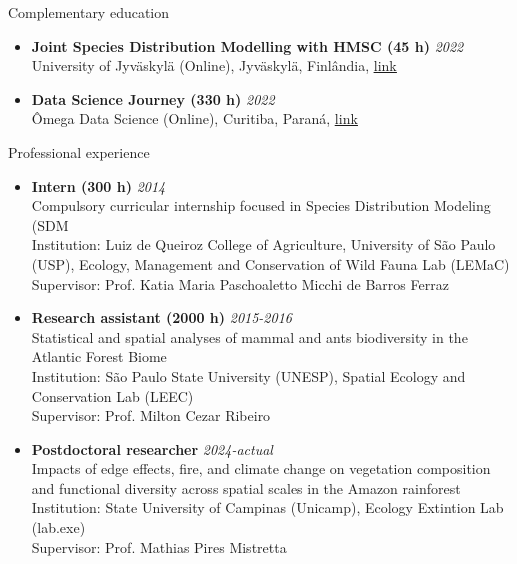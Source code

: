 \documentclass{resume}
\begin{document}
\begin{rSection}{Complementary education}
\begin{itemize}
\item {\bf Joint Species Distribution Modelling with HMSC (45 h)} \hfill {\em 2022}\\
University of Jyväskylä (Online), Jyväskylä, Finlândia, \href{https://www.helsinki.fi/en/researchgroups/statistical-ecology/software/hmsc}{\underline{link}}

\item {\bf Data Science Journey (330 h)} \hfill {\em 2022}\\
Ômega Data Science (Online), Curitiba, Paraná, \href{https://escola.omegadatascience.com.br}{\underline{link}}
\end{itemize} 

\end{rSection}


\begin{rSection}{Professional experience}
\begin{itemize}
\item {\bf Intern (300 h)} \hfill{\em 2014}\\
Compulsory curricular internship focused in Species Distribution Modeling (SDM\\
Institution: Luiz de Queiroz College of Agriculture, University of São Paulo (USP), Ecology, Management and Conservation of Wild Fauna Lab (LEMaC)\\
Supervisor: Prof. Katia Maria Paschoaletto Micchi de Barros Ferraz

\item {\bf Research assistant (2000 h)} \hfill{\em 2015-2016}\\
Statistical and spatial analyses of mammal and ants biodiversity in the Atlantic Forest Biome\\
Institution: São Paulo State University (UNESP), Spatial Ecology and Conservation Lab (LEEC)\\
Supervisor: Prof. Milton Cezar Ribeiro

\item {\bf Postdoctoral researcher} \hfill{\em 2024-actual}\\
Impacts of edge effects, fire, and climate change on vegetation composition and functional diversity across spatial scales in the Amazon rainforest\\
Institution: State University of Campinas (Unicamp), Ecology Extintion Lab (lab.exe)\\
Supervisor: Prof. Mathias Pires Mistretta
\end{itemize}
\end{rSection}
\end{document}

